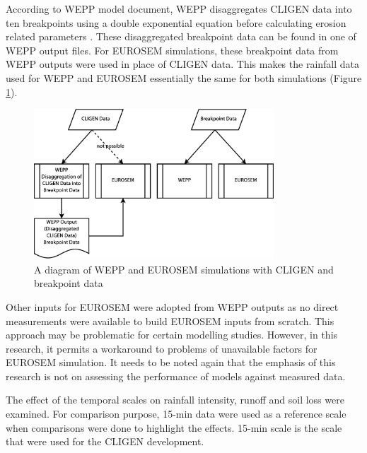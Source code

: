 According to WEPP model document, WEPP disaggregates CLIGEN data into ten
breakpoints using a double exponential equation before calculating erosion
related parameters \citep[see][\S 2.2]{flanagan1995-usda}. These disaggregated
breakpoint data can be found in one of WEPP output files. For EUROSEM
simulations, these breakpoint data from WEPP outputs were used in place of
CLIGEN data. This makes the rainfall data used for WEPP and EUROSEM essentially
the same for both simulations (Figure \ref{fig:eurosem_cligen_workaround}).

\begin{figure}[htbp]
  \centering
    \includegraphics[width=0.8\textwidth]{./img/eurosem_cligen_workaround}
  \caption{A diagram of WEPP and EUROSEM simulations with CLIGEN and breakpoint
data}
  \label{fig:eurosem_cligen_workaround}
\end{figure}

Other inputs for EUROSEM were adopted from WEPP outputs as no direct
measurements were available to build EUROSEM inputs from scratch. This approach
may be problematic for certain modelling studies. However, in this research, it
permits a workaround to problems of unavailable factors for EUROSEM simulation.
It needs to be noted again that the emphasis of this research is not on
assessing the performance of models against measured data.

The effect of the temporal scales on rainfall intensity, runoff and soil loss
were examined. For comparison purpose, 15-min data were used as a reference
scale when comparisons were done to highlight the effects. 15-min scale is
the scale that were used for the CLIGEN development.


